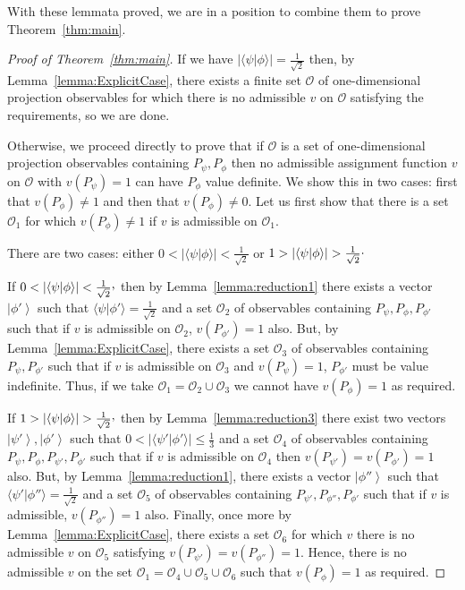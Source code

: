 \documentclass[%
 superscriptaddress,
 preprint,
 showpacs,
 showkeys,
 nofootinbib,
  amsmath,amssymb,
  aps,
  longbibliography,
  floatfix,
 ]{revtex4-1}
\theoremstyle{definition}
\newcommand{\ket}[1]{\left| #1 \right>}
\newcommand{\iprod}[2]{\langle #1 | #2 \rangle}
\begin{document}
With these lemmata proved, we are in a position to combine them to prove Theorem~\ref{thm:main}.


\begin{proof}[Proof of Theorem~\ref{thm:main}]
	
	If we have $|\iprod{\psi}{\phi}|=\frac{1}{\sqrt{2}}$ then, by Lemma~\ref{lemma:ExplicitCase}, there exists a finite set $\mathcal{O}$ {\color{blue}of one-dimensional projection observables} for which there is no admissible $v$ on $\mathcal{O}$ satisfying the requirements, so we are done.
	
	Otherwise, we proceed directly to prove that if $\mathcal{O}$ is a set of {\color{blue}one-dimensional projection} observables containing $P_\psi,P_\phi$ then no admissible assignment function $v$ on $\mathcal{O}$ with $v(P_\psi)=1$ can have $P_\phi$ value definite.
	We show this in two cases: first that $v(P_\phi)\neq 1$ and then that $v(P_\phi)\neq 0$.
	Let us first show that there is a set $\mathcal{O}_1$ for which $v(P_\phi)\neq 1$ if $v$ is admissible on $\mathcal{O}_1$.
	
	There are two cases: either $0 < |\iprod{\psi}{\phi}| < \frac{1}{\sqrt{2}}$ or $1 > |\iprod{\psi}{\phi}| > \frac{1}{\sqrt{2}}\raisebox{.8mm}{.}$
	
	If $0 < |\iprod{\psi}{\phi}| < \frac{1}{\sqrt{2}}\raisebox{.8mm}{,}$ then by Lemma~\ref{lemma:reduction1} there exists a vector $\ket{\phi'}$ such that $\iprod{\psi}{\phi'}=\frac{1}{\sqrt{2}}$ and a set $\mathcal{O}_2$ of observables containing $P_\psi,P_\phi,P_{\phi'}$ such that if $v$ is admissible on $\mathcal{O}_2$, $v(P_{\phi'})=1$ also.
	But, by Lemma~\ref{lemma:ExplicitCase}, there exists a set $\mathcal{O}_3$ of observables containing $P_\psi,P_{\phi'}$ such that if $v$ is admissible on $\mathcal{O}_3$ and $v(P_\psi)=1$, $P_{\phi'}$ must be value indefinite.
	Thus, if we take $\mathcal{O}_1=\mathcal{O}_2\cup \mathcal{O}_3$ we cannot have $v(P_\phi)=1$ as required.
	
	If $1 > |\iprod{\psi}{\phi}| > \frac{1}{\sqrt{2}}\raisebox{.8mm}{,}$ then by Lemma~\ref{lemma:reduction3} there exist two vectors $\ket{\psi'},\ket{\phi'}$ such that $0<|\iprod{\psi'}{\phi'}|\le \frac{1}{3}$ and a set $\mathcal{O}_4$ of observables containing $P_\psi,P_\phi,P_{\psi'},P_{\phi'}$ such that if $v$ is admissible on $\mathcal{O}_4$ then $v(P_{\psi'})=v(P_{\phi'})=1$ also.
	But, by Lemma~\ref{lemma:reduction1}, there exists a vector $\ket{\phi''}$ such that $\iprod{\psi'}{\phi''}=\frac{1}{\sqrt{2}}$ and a set $\mathcal{O}_5$ of observables containing $P_{\psi'},P_{\phi''},P_{\phi'}$ such that if $v$ is admissible, $v(P_{\phi''})=1$ also.
	Finally, once more by Lemma~\ref{lemma:ExplicitCase}, there exists a set $\mathcal{O}_6$ for which $v$ there is no admissible $v$ on $\mathcal{O}_5$ satisfying $v(P_{\psi'})=v(P_{\phi''})=1$.
	Hence, there is no admissible $v$ on the set $\mathcal{O}_1=\mathcal{O}_4\cup \mathcal{O}_5\cup\mathcal{O}_6$ such that $v(P_\phi)=1$ as required.
	

\end{proof}
\end{document}
